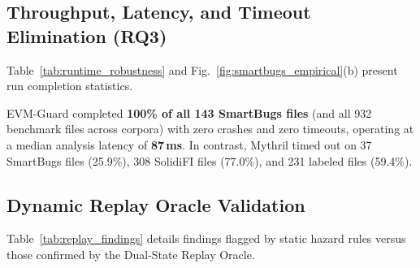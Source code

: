 \documentclass[conference]{IEEEtran}
\begin{document}
\subsection{Throughput, Latency, and Timeout Elimination (RQ3)}
Table~\ref{tab:runtime_robustness} and Fig.~\ref{fig:smartbugs_empirical}(b) present run completion statistics.

\begin{table}[h]
\centering
\small
\renewcommand{\arraystretch}{1.12}
\caption{Tool Execution Outcomes and Wall Time on SmartBugs-Curated}
\label{tab:runtime_robustness}
\end{table}

EVM-Guard completed \textbf{100\% of all 143 SmartBugs files} (and all 932 benchmark files across corpora) with zero crashes and zero timeouts, operating at a median analysis latency of \textbf{87\,ms}. In contrast, Mythril timed out on 37 SmartBugs files (25.9\%), 308 SolidiFI files (77.0\%), and 231 labeled files (59.4\%). 

\subsection{Dynamic Replay Oracle Validation}
Table~\ref{tab:replay_findings} details findings flagged by static hazard rules versus those confirmed by the Dual-State Replay Oracle.

\begin{table}[h]
\centering
\small
\renewcommand{\arraystretch}{1.12}
\caption{EVM-Guard Findings Flagged (F) vs. Sandbox Replay Confirmed (C)}
\label{tab:replay_findings}
\end{table}
\end{document}
